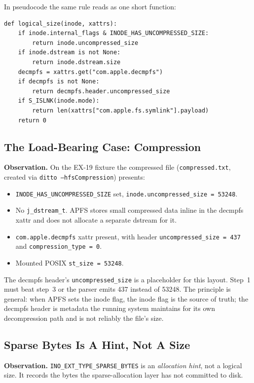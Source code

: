 In pseudocode the same rule reads as one short function:

\begin{verbatim}
def logical_size(inode, xattrs):
    if inode.internal_flags & INODE_HAS_UNCOMPRESSED_SIZE:
        return inode.uncompressed_size
    if inode.dstream is not None:
        return inode.dstream.size
    decmpfs = xattrs.get("com.apple.decmpfs")
    if decmpfs is not None:
        return decmpfs.header.uncompressed_size
    if S_ISLNK(inode.mode):
        return len(xattrs["com.apple.fs.symlink"].payload)
    return 0
\end{verbatim}

\subsection{The Load-Bearing Case: Compression}

\textbf{Observation.} On the EX-19 fixture the compressed file
(\texttt{compressed.txt}, created via
\texttt{ditto --hfsCompression}) presents:

\begin{itemize}
  \item \texttt{INODE\_HAS\_UNCOMPRESSED\_SIZE} set,
    \texttt{inode.uncompressed\_size = 53248}.
  \item No \texttt{j\_dstream\_t}. APFS stores small compressed data
    inline in the decmpfs xattr and does not allocate a separate
    dstream for it.
  \item \texttt{com.apple.decmpfs} xattr present, with header
    \texttt{uncompressed\_size = 437} and
    \texttt{compression\_type = 0}.
  \item Mounted POSIX \texttt{st\_size = 53248}.
\end{itemize}

The decmpfs header's \texttt{uncompressed\_size} is a placeholder
for this layout. Step~1 must beat step~3 or the parser emits 437
instead of 53248. The principle is general: when APFS sets the
inode flag, the inode flag is the source of truth; the decmpfs
header is metadata the running system maintains for its own
decompression path and is not reliably the file's size.

\subsection{Sparse Bytes Is A Hint, Not A Size}

\textbf{Observation.}
\texttt{INO\_EXT\_TYPE\_SPARSE\_BYTES} is an
\emph{allocation hint}, not a logical size. It records the bytes the
sparse-allocation layer has not committed to disk.

